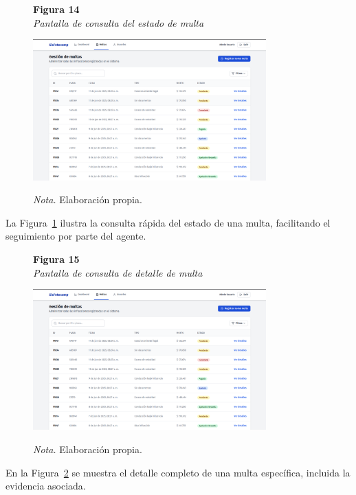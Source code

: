  \begin{figure}[htbp]
    \begin{flushleft}
        \textbf{Figura 14}\\[2em]
        \textit{Pantalla de consulta del estado de multa}
    \end{flushleft}
    \vspace{1em}
    \centering
    \includegraphics[width=0.8\textwidth]{Images/UI4.png}
    \vspace{2em}
    \begin{flushleft}
        \textit{Nota.} Elaboración propia.
    \end{flushleft}
    \label{fig:consulta_estado_multa}
\end{figure}
La Figura~\ref{fig:consulta_estado_multa} ilustra la consulta rápida del estado de una multa, facilitando el seguimiento por parte del agente.
 \begin{figure}[htbp]
    \begin{flushleft}
        \textbf{Figura 15}\\[2em]
        \textit{Pantalla de consulta de detalle de multa}
    \end{flushleft}
    \vspace{1em}
    \centering
    \includegraphics[width=0.8\textwidth]{Images/UI4.png}
    \vspace{2em}
    \begin{flushleft}
        \textit{Nota.} Elaboración propia.
    \end{flushleft}
    \label{fig:consulta_detalle_multa}
\end{figure}
En la Figura~\ref{fig:consulta_detalle_multa} se muestra el detalle completo de una multa específica, incluida la evidencia asociada.
